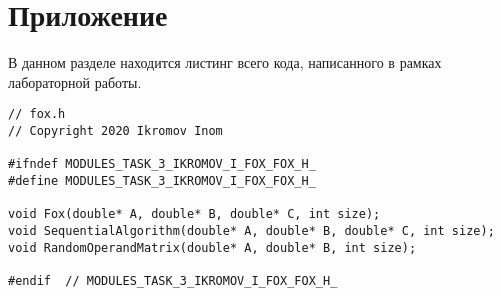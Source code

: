 \documentclass{report}
\begin{document}
\section*{Приложение}
В данном разделе находится листинг всего кода, написанного в рамках лабораторной работы.
\begin{lstlisting}
// fox.h
// Copyright 2020 Ikromov Inom

#ifndef MODULES_TASK_3_IKROMOV_I_FOX_FOX_H_
#define MODULES_TASK_3_IKROMOV_I_FOX_FOX_H_

void Fox(double* A, double* B, double* C, int size);
void SequentialAlgorithm(double* A, double* B, double* C, int size);
void RandomOperandMatrix(double* A, double* B, int size);

#endif  // MODULES_TASK_3_IKROMOV_I_FOX_FOX_H_
\end{lstlisting}
\end{document}
